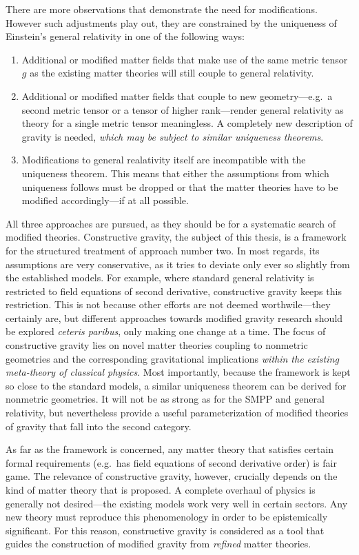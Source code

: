 There are more observations \cite{} that demonstrate the need for modifications. However such adjustments play out, they are constrained by the uniqueness of Einstein's general relativity in one of the following ways:
\begin{enumerate}
  \item Additional or modified matter fields that make use of the same metric tensor $g$ as the existing matter theories will still couple to general relativity.
  \item Additional or modified matter fields that couple to new geometry---e.g.~a second metric tensor or a tensor of higher rank---render general relativity as theory for a single metric tensor meaningless. A completely new description of gravity is needed, \emph{which may be subject to similar uniqueness theorems}.
  \item Modifications to general realativity itself are incompatible with the uniqueness theorem. This means that either the assumptions from which uniqueness follows must be dropped or that the matter theories have to be modified accordingly---if at all possible.
\end{enumerate}
All three approaches are pursued, as they should be for a systematic search of modified theories. Constructive gravity, the subject of this thesis, is a framework for the structured treatment of approach number two. In most regards, its assumptions are very conservative, as it tries to deviate only ever so slightly from the established models. For example, where standard general relativity is restricted to field equations of second derivative, constructive gravity keeps this restriction. This is not because other efforts are not deemed worthwile---they certainly are, but different approaches towards modified gravity research should be explored \emph{ceteris paribus}, only making one change at a time. The focus of constructive gravity lies on novel matter theories coupling to nonmetric geometries and the corresponding gravitational implications \emph{within the existing meta-theory of classical physics}. Most importantly, because the framework is kept so close to the standard models, a similar uniqueness theorem can be derived for nonmetric geometries. It will not be as strong as for the SMPP and general relativity, but nevertheless provide a useful parameterization of modified theories of gravity that fall into the second category.

As far as the framework is concerned, any matter theory that satisfies certain formal requirements (e.g.~has field equations of second derivative order) is fair game. The relevance of constructive gravity, however, crucially depends on the kind of matter theory that is proposed. A complete overhaul of physics is generally not desired---the existing models work very well in certain sectors. Any new theory must reproduce this phenomenology in order to be epistemically significant. For this reason, constructive gravity is considered as a tool that guides the construction of modified gravity from \emph{refined} matter theories.

